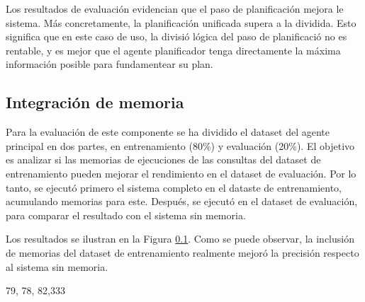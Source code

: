 Los resultados de evaluación evidencian que el paso de planificación mejora le sistema. Más concretamente, la planificación unificada supera a la dividida. Esto significa que en este caso de uso, la divisió lógica del paso de planificació no es rentable, y es mejor que el agente planificador tenga directamente la máxima información posible para fundamentear su plan. 

\subsection{Integración de memoria}
Para la evaluación de este componente se ha dividido el dataset del agente principal en dos partes, en entrenamiento (80\%) y evaluación (20\%). El objetivo es analizar si las memorias de ejecuciones de las consultas del dataset de entrenamiento pueden mejorar el rendimiento en el dataset de evaluación. Por lo tanto, se ejecutó primero el sistema completo en el dataste de entrenamiento, acumulando memorias para este. Después, se ejecutó en el dataset de evaluación, para comparar el resultado con el sistema sin memoria.

Los resultados se ilustran en la Figura \ref{}. Como se puede observar, la inclusión de memorias del dataset de entrenamiento realmente mejoró la precisión respecto al sistema sin memoria.
































\clearpage

79, 78, 82,333

